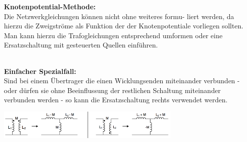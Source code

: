  	\textbf{Knotenpotential-Methode:}\\
	Die Netzwerkgleichungen können nicht ohne weiteres formu- liert werden, da hierzu die Zweigströme als Funktion der der Knotenpotentiale vorliegen sollten. Man kann hierzu die Trafogleichungen entsprechend umformen oder eine Ersatzschaltung mit gesteuerten Quellen einführen.\\ \\
	\begin{minipage}{9cm}
		\textbf{Einfacher Spezialfall:}\\
			Sind bei einem Übertrager die einen Wicklungsenden miteinander verbunden - oder dürfen sie ohne Beeinflussung der restlichen Schaltung miteinander verbunden werden - so kann die Ersatzschaltung rechts verwendet werden.
	\end{minipage}
	\begin{minipage}{9cm}
	\includegraphics[width=9cm]{./images/netzwerkanalyse-kopplung-spulen.png}
	\end{minipage}




